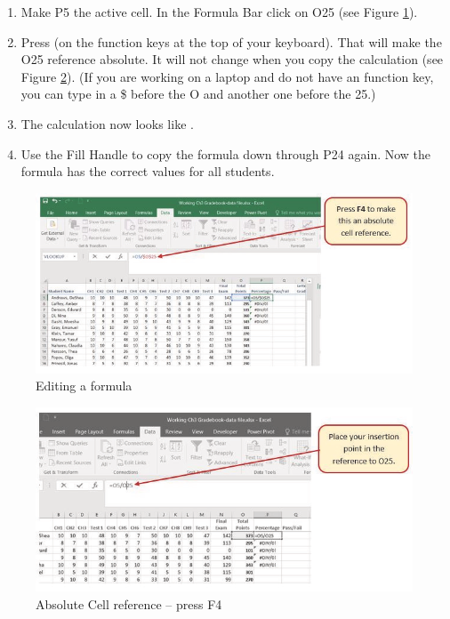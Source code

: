 \begin{enumerate}
	\item Make \textsf{P5} the active cell. In the Formula Bar click on O25 (see Figure \ref{03:fig07}).
	\item Press  (on the function keys at the top of your keyboard). That will make the \textsf{O25} reference absolute. It will not change when you copy the calculation (see Figure \ref{03:fig08}). (If you are working on a laptop and do not have an  function key, you can type in a \$ before the \textsf{O} and another one before the \textsf{25}.)
	\item The calculation now looks like .
	\item Use the Fill Handle to copy the formula down through \textsf{P24} again. Now the formula has the correct values for all students.
\end{enumerate}

\begin{figure}[H]
	\centering
	\includegraphics[width=\maxwidth{.95\linewidth}]{gfx/ch03_fig07}
	\caption{Editing a formula}
	\label{03:fig07}
\end{figure}

\begin{figure}[H]
	\centering
	\includegraphics[width=\maxwidth{.95\linewidth}]{gfx/ch03_fig08}
	\caption{Absolute Cell reference – press F4}
	\label{03:fig08}
\end{figure}

